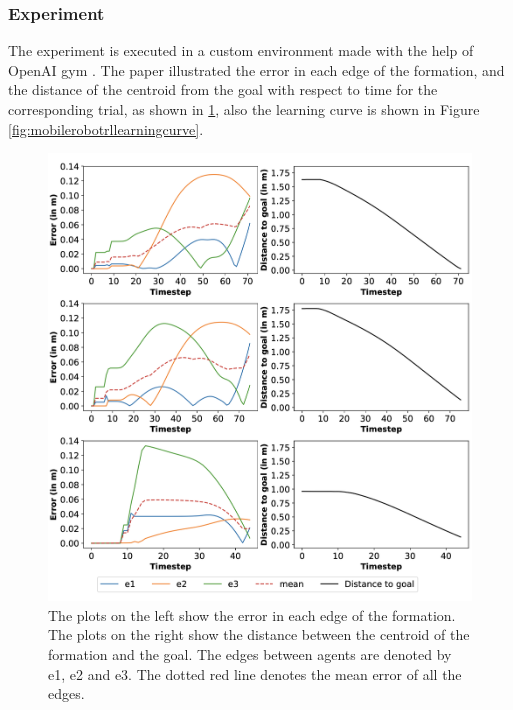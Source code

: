\subsubsection{Experiment}

The experiment is executed in a custom environment made with the help of OpenAI gym \cite{brockman2016openai}.
The paper illustrated the error in each edge of the formation, and the distance of the centroid from the goal with respect to time for the corresponding trial, as shown in \ref{fig:mobilerobotrlresult}, also the learning curve is shown in Figure \ref{fig:mobilerobotrllearningcurve}.

\begin{figure}
	\centering
	\includegraphics[width=5in]{mobilerobotrlresult.png}
	\caption{The plots on the left show the error in each edge of the formation. The plots on the right show the distance between the centroid of the formation and the goal. The edges between agents are denoted by e1, e2 and e3. The dotted red line denotes the mean error of all the edges.}
	\label{fig:mobilerobotrlresult} 
\end{figure}

